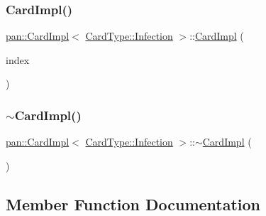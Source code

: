 \subsubsection{\texorpdfstring{Card\+Impl()}{CardImpl()}}
{\footnotesize\ttfamily \hyperlink{classpan_1_1_card_impl}{pan\+::\+Card\+Impl}$<$ \hyperlink{namespacepan_a1f7350bfd0421afeabe9fa95c16fa811af0ddc0838281faf6d55e2cf840a2a8ef}{Card\+Type\+::\+Infection} $>$\+::\hyperlink{classpan_1_1_card_impl}{Card\+Impl} (\begin{DoxyParamCaption}\item[{\hyperlink{namespacepan_afaed28aa6603153dcc062a028602d697}{City\+Index}}]{index }\end{DoxyParamCaption})}

\mbox{\label{classpan_1_1_card_impl_3_01_card_type_1_1_infection_01_4_ae3fe3d61f83d4f5a79a08d0dad43b9c2}} 
\subsubsection{\texorpdfstring{$\sim$\+Card\+Impl()}{~CardImpl()}}
{\footnotesize\ttfamily \hyperlink{classpan_1_1_card_impl}{pan\+::\+Card\+Impl}$<$ \hyperlink{namespacepan_a1f7350bfd0421afeabe9fa95c16fa811af0ddc0838281faf6d55e2cf840a2a8ef}{Card\+Type\+::\+Infection} $>$\+::$\sim$\hyperlink{classpan_1_1_card_impl}{Card\+Impl} (\begin{DoxyParamCaption}{ }\end{DoxyParamCaption})\hspace{0.3cm}{\ttfamily [default]}}



\subsection{Member Function Documentation}
\mbox{\label{classpan_1_1_card_impl_3_01_card_type_1_1_infection_01_4_a5e31904120b655ce59633433a4d4c17c}} 

